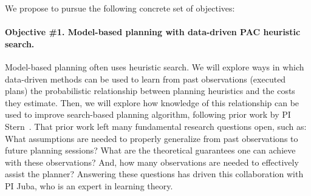 \documentclass[12pt]{article}
\begin{document}
We propose to pursue the following concrete set of objectives:

\vspace{-0.35cm}
\paragraph{Objective \#1. Model-based planning with data-driven PAC heuristic search.}
Model-based planning often uses heuristic search. We will explore ways in which data-driven methods can be used to learn from past observations (executed plans) the probabilistic relationship between planning heuristics and the costs they estimate. Then, we will explore how knowledge of this relationship can be used to improve search-based planning algorithm, following prior work by PI Stern~\cite{stern2011probably,stern2012exploring,stern2014potential}.
That prior work left many fundamental research questions open, such as: What assumptions are needed to properly generalize from past observations to future planning sessions? What are the theoretical guarantees one can achieve with these observations? And, how many observations are needed to effectively assist the planner? Answering these questions has driven this collaboration with PI Juba, who is an expert in learning theory. 


\vspace{-0.35cm}
\end{document}

